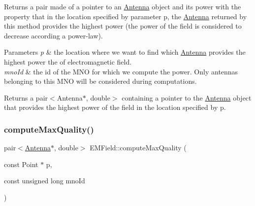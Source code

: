 Returns a pair made of a pointer to an \mbox{\hyperlink{class_antenna}{Antenna}} object and its power with the property that in the location specified by parameter p, the \mbox{\hyperlink{class_antenna}{Antenna}} returned by this method provides the highest power (the power of the field is considered to decrease according a power-\/law). 
\begin{DoxyParams}{Parameters}
{\em p} & the location where we want to find which \mbox{\hyperlink{class_antenna}{Antenna}} provides the highest power the of electromagnetic field. \\
\hline
{\em mno\+Id} & the id of the M\+NO for which we compute the power. Only antennas belonging to this M\+NO will be considered during computations. \\
\hline
\end{DoxyParams}
\begin{DoxyReturn}{Returns}
a pair$<$\+Antenna$\ast$, double$>$ containing a pointer to the \mbox{\hyperlink{class_antenna}{Antenna}} object that provides the highest power of the field in the location specified by p. 
\end{DoxyReturn}
\mbox{\label{class_e_m_field_ac866f6224e34895a0ee085c4baf43a01}} 
\subsubsection{\texorpdfstring{computeMaxQuality()}{computeMaxQuality()}}
{\footnotesize\ttfamily pair$<$\mbox{\hyperlink{class_antenna}{Antenna}}$\ast$, double$>$ E\+M\+Field\+::compute\+Max\+Quality (\begin{DoxyParamCaption}\item[{const Point $\ast$}]{p,  }\item[{const unsigned long}]{mno\+Id }\end{DoxyParamCaption})}

